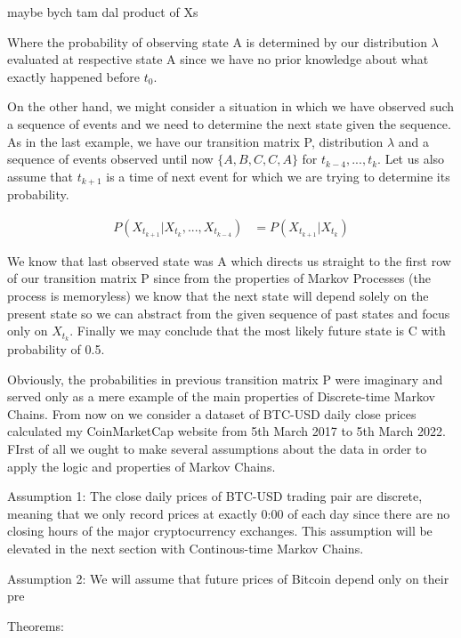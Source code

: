 maybe bych tam dal product of Xs

Where the probability of observing state A is determined by our distribution $\lambda$ evaluated at respective state A since we have no prior knowledge about what exactly happened before $t_0$. 

On the other hand, we might consider a situation in which we have observed such a sequence of events and we need to determine the next state given the sequence. As in the last example, we have our transition matrix P, distribution $\lambda$ and a sequence of events observed until now $\{A,B,C,C,A\}$ for $t_{k-4},...,t_{k}$. Let us also assume that $t_{k+1}$ is a time of next event for which we are trying to determine its probability.

\begin{align}
P(X_{t_{k+1}}|X_{t_{k}},...,X_{t_{k-4}}) &= P(X_{t_{k+1}}|X_{t_{k}})
\end{align}

We know that last observed state was A which directs us straight to the first row of our transition matrix P since from the properties of Markov Processes (the process is memoryless) we know that the next state will depend solely on the present state so we can abstract from the given sequence of past states and focus only on $X_{t_{k}}$. Finally we may conclude that the most likely future state is C with probability of 0.5. 

Obviously, the probabilities in previous transition matrix P were imaginary and served only as a mere example of the main properties of Discrete-time Markov Chains. From now on we consider a dataset of BTC-USD daily close prices calculated my CoinMarketCap website from 5th March 2017 to 5th March 2022. FIrst of all we ought to make several assumptions about the data in order to apply the logic and properties of Markov Chains. 

Assumption 1: The close daily prices of BTC-USD trading pair are discrete, meaning that we only record prices at exactly 0:00 of each day since there are no closing hours of the major cryptocurrency exchanges. This assumption will be elevated in the next section with Continous-time Markov Chains.

Assumption 2: We will assume that future prices of Bitcoin depend only on their pre





Theorems:





